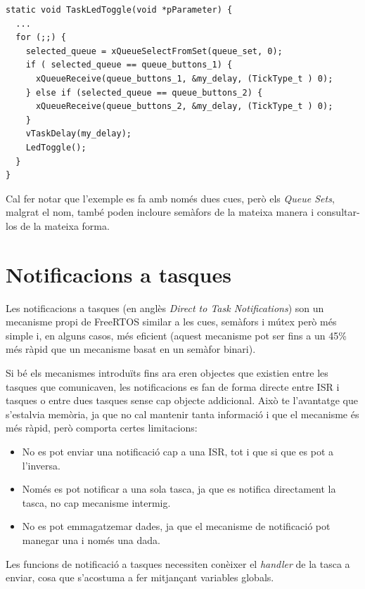 \begin{lstlisting}[style=customc,caption={Tasca que fa servir el conjunt de cues}, label=QueueSetTask]
static void TaskLedToggle(void *pParameter) {
  ...
  for (;;) {
    selected_queue = xQueueSelectFromSet(queue_set, 0);
    if ( selected_queue == queue_buttons_1) {
      xQueueReceive(queue_buttons_1, &my_delay, (TickType_t ) 0);
    } else if (selected_queue == queue_buttons_2) {
      xQueueReceive(queue_buttons_2, &my_delay, (TickType_t ) 0);     
    } 
    vTaskDelay(my_delay);
    LedToggle();
  }
} 
\end{lstlisting}

Cal fer notar que l'exemple es fa amb només dues cues, però els {\em Queue Sets}, malgrat el nom, també poden incloure semàfors de la mateixa manera i consultar-los de la mateixa forma.

\section{Notificacions a tasques}
Les notificacions a tasques (en anglès {\em Direct to Task Notifications}) son  un mecanisme propi de FreeRTOS similar a les cues, semàfors i mútex però més simple i, en alguns casos, més eficient (aquest mecanisme pot ser fins a un 45\% més ràpid que un mecanisme basat en un semàfor binari). 

Si bé els mecanismes introduïts fins ara eren objectes que existien entre les tasques que comunicaven, les notificacions es fan de forma directe entre \gls{ISR} i tasques o entre dues tasques sense cap objecte addicional. Això te l'avantatge que s'estalvia memòria, ja que no cal mantenir tanta informació i que el mecanisme és més ràpid, però comporta certes limitacions:
\begin{itemize}
 \item  No es pot enviar una notificació cap a una \gls{ISR}, tot i que si que es pot a l'inversa.
 \item  Només es pot notificar a una sola tasca, ja que es notifica directament la tasca, no cap mecanisme intermig.
 \item No es pot emmagatzemar dades, ja que el mecanisme de notificació pot manegar una i només una dada.
\end{itemize}

Les funcions de notificació a tasques necessiten conèixer el {\em handler} de la tasca a enviar, cosa que s'acostuma a fer mitjançant variables globals.

